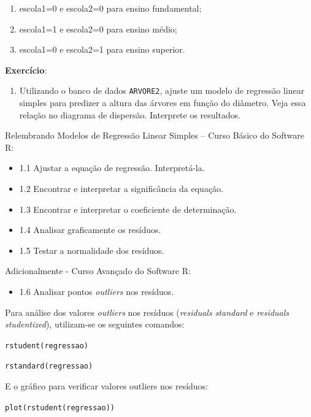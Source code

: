 \documentclass[12pt,brazil,]{book}
\providecommand{\tightlist}{%
  \setlength{\itemsep}{0pt}\setlength{\parskip}{0pt}}
\begin{document}
\begin{enumerate}
\def\labelenumi{\alph{enumi}.}
\tightlist
\item
  escola1=0 e escola2=0 para ensino fundamental;
\item
  escola1=1 e escola2=0 para ensino médio;
\item
  escola1=0 e escola2=1 para ensino superior.
\end{enumerate}

\textbf{Exercício}:

\begin{enumerate}
\def\labelenumi{\arabic{enumi})}
\tightlist
\item
  Utilizando o banco de dados \texttt{ARVORE2}, ajuste um modelo de
  regressão linear simples para predizer a altura das árvores em função
  do diâmetro. Veja essa relação no diagrama de dispersão. Interprete os
  resultados.
\end{enumerate}

Relembrando Modelos de Regressão Linear Simples -- Curso Básico do
Software R:

\begin{itemize}
\tightlist
\item
  1.1 Ajustar a equação de regressão. Interpretá-la.
\item
  1.2 Encontrar e interpretar a significância da equação.
\item
  1.3 Encontrar e interpretar o coeficiente de determinação.
\item
  1.4 Analisar graficamente os resíduos.
\item
  1.5 Testar a normalidade dos resíduos.
\end{itemize}

Adicionalmente - Curso Avançado do Software R:

\begin{itemize}
\tightlist
\item
  1.6 Analisar pontos \emph{outliers} nos resíduos.
\end{itemize}

Para análise dos valores \emph{outliers} nos resíduos (\emph{residuals
standard} e \emph{residuals studentized}), utilizam-se os seguintes
comandos:

\texttt{rstudent(regressao)}

\texttt{rstandard(regressao)}

E o gráfico para verificar valores outliers nos resíduos:

\texttt{plot(rstudent(regressao))}
\end{document}

